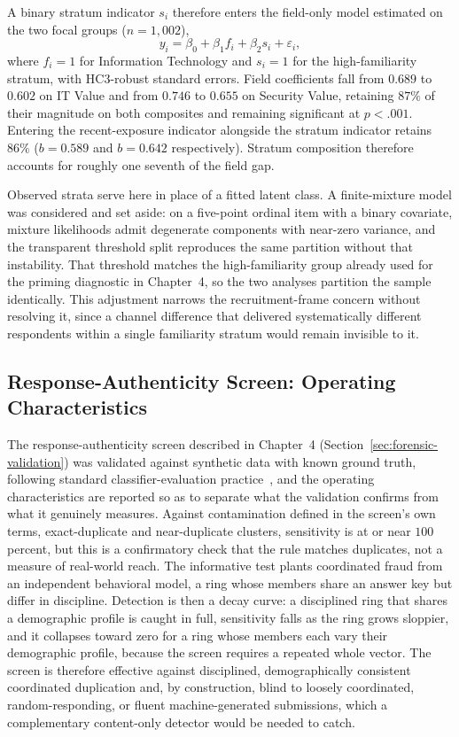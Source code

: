 A binary stratum indicator $s_i$ therefore enters the field-only model estimated on the two focal groups ($n=1{,}002$),
\begin{equation}
  y_i = \beta_0 + \beta_1 f_i + \beta_2 s_i + \varepsilon_i,
\end{equation}
where $f_i=1$ for Information Technology and $s_i=1$ for the high-familiarity stratum, with HC3-robust standard errors. Field coefficients fall from $0.689$ to $0.602$ on IT Value and from $0.746$ to $0.655$ on Security Value, retaining $87\%$ of their magnitude on both composites and remaining significant at $p<.001$. Entering the recent-exposure indicator alongside the stratum indicator retains $86\%$ ($b=0.589$ and $b=0.642$ respectively). Stratum composition therefore accounts for roughly one seventh of the field gap.

Observed strata serve here in place of a fitted latent class. A finite-mixture model was considered and set aside: on a five-point ordinal item with a binary covariate, mixture likelihoods admit degenerate components with near-zero variance, and the transparent threshold split reproduces the same partition without that instability. That threshold matches the high-familiarity group already used for the priming diagnostic in Chapter~4, so the two analyses partition the sample identically. This adjustment narrows the recruitment-frame concern without resolving it, since a channel difference that delivered systematically different respondents within a single familiarity stratum would remain invisible to it.

\subsection{Response-Authenticity Screen: Operating Characteristics}\label{sec:appb-forensic}

The response-authenticity screen described in Chapter~4 (Section~\ref{sec:forensic-validation}) was validated against synthetic data with known ground truth, following standard classifier-evaluation practice~\parencite{Fawcett_ROC_2006}, and the operating characteristics are reported so as to separate what the validation confirms from what it genuinely measures. Against contamination defined in the screen's own terms, exact-duplicate and near-duplicate clusters, sensitivity is at or near $100$ percent, but this is a confirmatory check that the rule matches duplicates, not a measure of real-world reach. The informative test plants coordinated fraud from an independent behavioral model, a ring whose members share an answer key but differ in discipline. Detection is then a decay curve: a disciplined ring that shares a demographic profile is caught in full, sensitivity falls as the ring grows sloppier, and it collapses toward zero for a ring whose members each vary their demographic profile, because the screen requires a repeated whole vector. The screen is therefore effective against disciplined, demographically consistent coordinated duplication and, by construction, blind to loosely coordinated, random-responding, or fluent machine-generated submissions, which a complementary content-only detector would be needed to catch.


